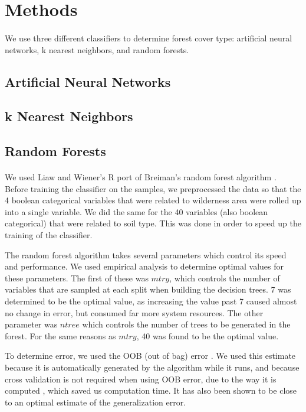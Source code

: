 \documentclass[11pt]{article}
\begin{document}
\section{Methods}
\paragraph{}
We use three different classifiers to determine forest cover type: artificial neural networks, k nearest neighbors, and random forests.
\subsection{Artificial Neural Networks}
\subsection{k Nearest Neighbors}
\subsection{Random Forests}
\paragraph{}
We used Liaw and Wiener's R port \cite{liaw02} of Breiman's random forest algorithm \cite{breiman01}. Before training the classifier on the samples, we preprocessed the data so that the 4 boolean categorical variables that were related to wilderness area were rolled up into a single variable. We did the same for the 40 variables (also boolean categorical) that were related to soil type. This was done in order to speed up the training of the classifier.
\par
The random forest algorithm takes several parameters which control its speed and performance. We used empirical analysis to determine optimal values for these parameters. The first of these was $mtry$, which controls the number of variables that are sampled at each split when building the decision trees. 7 was determined to be the optimal value, as increasing the value past 7 caused almost no change in error, but consumed far more system resources. The other parameter was $ntree$ which controls the number of trees to be generated in the forest. For the same reasons as $mtry$, 40 was found to be the optimal value.
\par
To determine error, we used the OOB (out of bag) error \cite{breiman96}. We used this estimate because it is automatically generated by the algorithm while it runs, and because cross validation is not required when using OOB error, due to the way it is computed \cite{breiman01, breiman96}, which saved us computation time. It has also been shown to be close to an optimal estimate of the generalization error\cite{breiman96}.
\end{document}
